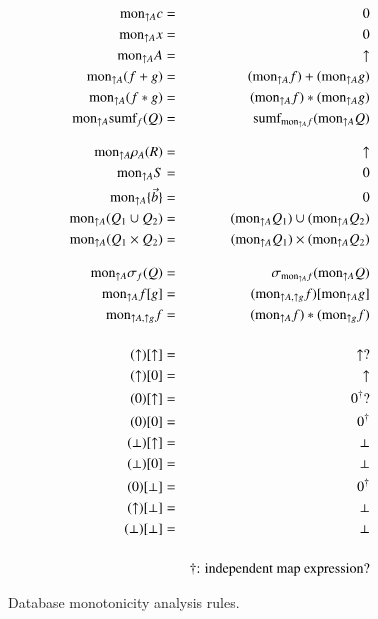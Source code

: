 \documentclass{article}
\begin{document}
\begin{figure}
\begin{eqnarray*}
\algmon_{\uparrow A} c &=& 0
\\
\algmon_{\uparrow A} x &=& 0
\\
\algmon_{\uparrow A} A &=& \uparrow
\\
\algmon_{\uparrow A} (f + g) &=&
(\algmon_{\uparrow A} f) + (\algmon_{\uparrow A} g)
\\
\algmon_{\uparrow A} (f * g) &=&
(\algmon_{\uparrow A} f) * (\algmon_{\uparrow A} g)
\\
\algmon_{\uparrow A} \algsumf_{f}(Q) &=&
\algsumf_{\algmon_{\uparrow A} f}(\algmon_{\uparrow A} Q)
%
%
%
\\[2ex]
\algmon_{\uparrow A} \rho_{A}(R) &=& \uparrow
\\
\algmon_{\uparrow A} S &=& 0
\\
\algmon_{\uparrow A} \{ \vec{b} \} &=& 0
\\
\algmon_{\uparrow A} (Q_1 \cup Q_2) &=&
(\algmon_{\uparrow A} Q_1) \cup (\algmon_{\uparrow A} Q_2)
\\
\algmon_{\uparrow A} (Q_1 \times Q_2) &=&
(\algmon_{\uparrow A} Q_1) \times (\algmon_{\uparrow A} Q_2)
%
%
\\[2ex]
\algmon_{\uparrow A} \sigma_{f} (Q) &=&
\sigma_{\algmon_{\uparrow A} f} (\algmon_{\uparrow A} Q)
\\
\algmon_{\uparrow A} f[g] &=&
(\algmon_{\uparrow A, \uparrow g} f)[\algmon_{\uparrow A} g]
\\
\algmon_{\uparrow A, \uparrow g} f &=& 
(\algmon_{\uparrow A} f) * (\algmon_{\uparrow g} f)
%
%
%
\\[3ex]
(\uparrow)[\uparrow] &=& \uparrow ?
\\
(\uparrow)[0] &=& \uparrow
\\
(0)[\uparrow] &=& 0^{\dagger} ?
\\
(0)[0] &=& 0^{\dagger}
\\
(\perp)[\uparrow] &=& \perp
\\
(\perp)[0] &=& \perp
\\
(0)[\perp] &=& 0^{\dagger}
\\
(\uparrow)[\perp] &=& \perp
\\
(\perp)[\perp] &=& \perp
%
%
\\[3ex]
& & \mbox{$\dagger$: independent map expression?}
\end{eqnarray*}
\caption{Database monotonicity analysis rules.}
\end{figure}
\end{document}
